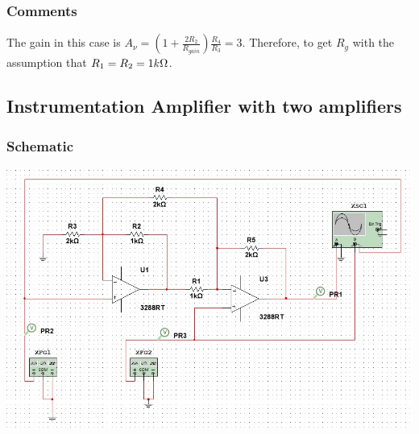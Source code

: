 \documentclass[a4paper, 12pt, english]{article}
\newenvironment{Figure}
  {\par\medskip\noindent\minipage{\linewidth}}
  {\endminipage\par\medskip}
\begin{document}
\subsubsection{Comments}
The gain in this case is \(A_{\nu}=(1+\frac{2R_{2}}{R_{gain}})\frac{R_{4}}{R_{3}} = 3\). Therefore, to get $R_{g}$ with the assumption that $R_{1} = R_{2} = 1k\ohm$.


\subsection{Instrumentation Amplifier with two amplifiers}
\subsubsection{Schematic}
\begin{Figure}
 \centering
 \includegraphics[width=1.2\linewidth, scale=2]{images/Instrumentation2amps.png}
\end{Figure}
\end{document}
